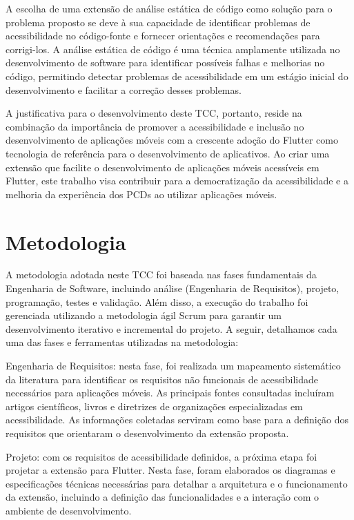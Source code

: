 A escolha de uma extensão de análise estática de código como solução para o problema proposto se deve à sua capacidade de identificar problemas de acessibilidade no código-fonte e fornecer orientações e recomendações para corrigi-los. A análise estática de código é uma técnica amplamente utilizada no desenvolvimento de software para identificar possíveis falhas e melhorias no código, permitindo detectar problemas de acessibilidade em um estágio inicial do desenvolvimento e facilitar a correção desses problemas.

A justificativa para o desenvolvimento deste TCC, portanto, reside na combinação da importância de promover a acessibilidade e inclusão no desenvolvimento de aplicações móveis com a crescente adoção do Flutter como tecnologia de referência para o desenvolvimento de aplicativos. Ao criar uma extensão que facilite o desenvolvimento de aplicações móveis acessíveis em Flutter, este trabalho visa contribuir para a democratização da acessibilidade e a melhoria da experiência dos PCDs ao utilizar aplicações móveis.

\section{Metodologia}\label{sec:metodologia}

A metodologia adotada neste TCC foi baseada nas fases fundamentais da Engenharia de Software, incluindo análise (Engenharia de Requisitos), projeto, programação, testes e validação. Além disso, a execução do trabalho foi gerenciada utilizando a metodologia ágil Scrum para garantir um desenvolvimento iterativo e incremental do projeto. A seguir, detalhamos cada uma das fases e ferramentas utilizadas na metodologia:

Engenharia de Requisitos: nesta fase, foi realizada um mapeamento sistemático da literatura para identificar os requisitos não funcionais de acessibilidade necessários para aplicações móveis. As principais fontes consultadas incluíram artigos científicos, livros e diretrizes de organizações especializadas em acessibilidade. As informações coletadas serviram como base para a definição dos requisitos que orientaram o desenvolvimento da extensão proposta.

Projeto: com os requisitos de acessibilidade definidos, a próxima etapa foi projetar a extensão para Flutter. Nesta fase, foram elaborados os diagramas e especificações técnicas necessárias para detalhar a arquitetura e o funcionamento da extensão, incluindo a definição das funcionalidades e a interação com o ambiente de desenvolvimento.

